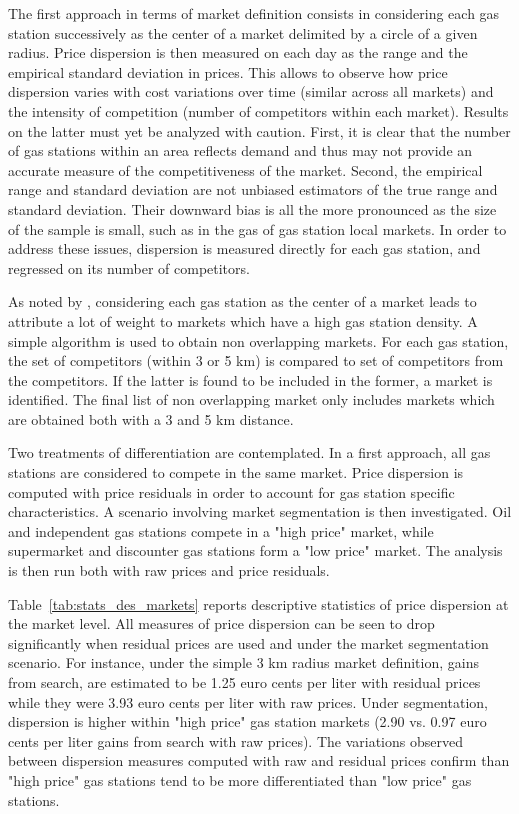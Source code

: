 \documentclass[english]{article}
\begin{document}
The first approach in terms of market definition consists in considering each gas station successively as the center of a market delimited by a circle of a given radius. Price dispersion is then measured on each day as the range and the empirical standard deviation in prices. This allows to observe how price dispersion varies with cost variations over time (similar across all markets) and the intensity of competition (number of competitors within each market). Results on the latter must yet be analyzed with caution. First, it is clear that the number of gas stations within an area reflects demand and thus may not provide an accurate measure of the competitiveness of the market. Second, the empirical range and standard deviation are not unbiased estimators of the true range and standard deviation. Their downward bias is all the more pronounced as the size of the sample is small, such as in the gas of gas station local markets. In order to address these issues, dispersion is measured directly for each gas station, and regressed on its number of competitors.

As noted by \cite{TAP11}, considering each gas station as the center of a market leads to attribute a lot of weight to markets which have a high gas station density. A simple algorithm is used to obtain non overlapping markets.  For each gas station, the set of competitors (within 3 or 5 km) is compared to set of competitors from the competitors. If the latter is found to be included in the former, a market is identified. The final list of non overlapping market only includes markets which are obtained both with a 3 and 5 km distance.

Two treatments of differentiation are contemplated. In a first approach, all gas stations are considered to compete in the same market. Price dispersion is computed with price residuals in order to account for gas station specific characteristics. A scenario involving market segmentation is then investigated. Oil and independent gas stations compete in a "high price" market, while supermarket and discounter gas stations form a "low price" market. The analysis is then run both with raw prices and price residuals.

Table~\ref{tab:stats_des_markets} reports descriptive statistics of price dispersion at the market level. All measures of price dispersion can be seen to drop significantly when residual prices are used and under the market segmentation scenario. For instance, under the simple 3 km radius market definition, gains from search, are estimated to be 1.25 euro cents per liter with residual prices while they were 3.93 euro cents per liter with raw prices. Under segmentation, dispersion is higher within "high price" gas station markets (2.90 vs. 0.97 euro cents per liter gains from search with raw prices). The variations observed between dispersion measures computed with raw and residual prices confirm than "high price" gas stations tend to be more differentiated than "low price" gas stations.
\end{document}
